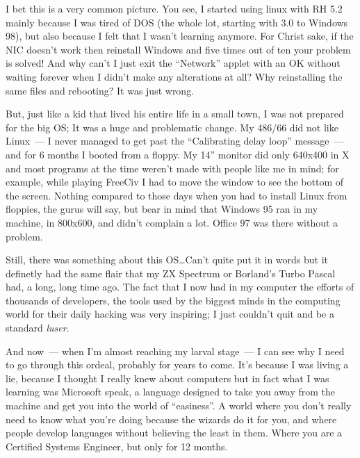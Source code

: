 \documentclass{book}
\begin{document}
I bet this is a very common picture. You see, I started using linux
with RH 5.2 mainly because I was tired of DOS (the whole lot, starting
with 3.0 to Windows 98), but also because I felt that I wasn't
learning anymore. For Christ sake, if the NIC doesn't work then
reinstall Windows and five times out of ten your problem is solved!
And why can't I just exit the ``Network'' applet with an OK without
waiting forever when I didn't make any alterations at all? Why
reinstalling the same files and rebooting?  It was just wrong.

But, just like a kid that lived his entire life in a small town, I was
not prepared for the big OS; It was a huge and problematic change. My
486/66 did not like Linux~--- I never managed to get past the
``Calibrating delay loop'' message~--- and for 6 months I booted from
a floppy. My 14'' monitor did only 640x400 in X and most programs at
the time weren't made with people like me in mind; for example, while
playing FreeCiv I had to move the window to see the bottom of the
screen. Nothing compared to those days when you had to install Linux
from floppies, the gurus will say, but bear in mind that Windows 95
ran in my machine, in 800x600, and didn't complain a lot. Office 97
was there without a problem.

Still, there was something about this OS\ldots Can't quite put it in
words but it definetly had the same flair that my ZX Spectrum or
Borland's Turbo Pascal had, a long, long time ago. The fact that I now
had in my computer the efforts of thousands of developers, the tools
used by the biggest minds in the computing world for their daily
hacking was very inspiring; I just couldn't quit and be a standard
\emph{luser}.

And now~--- when I'm almost reaching my larval stage~--- I can see why
I need to go through this ordeal, probably for years to come. It's
because I was living a lie, because I thought I really knew about
computers but in fact what I was learning was Microsoft speak, a
language designed to take you away from the machine and get you into
the world of ``easiness''. A world where you don't really need to know
what you're doing because the wizards do it for you, and where people
develop languages without believing the least in them. Where you are a
Certified Systems Engineer, but only for 12 months.
\end{document}
